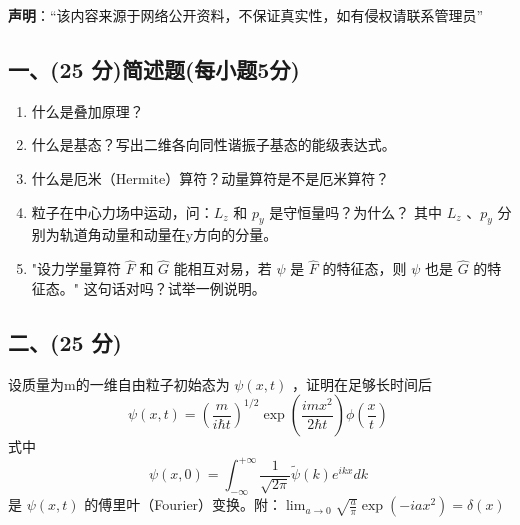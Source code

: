 
\textbf{声明}：“该内容来源于网络公开资料，不保证真实性，如有侵权请联系管理员”

\subsection{一、(25 分)简述题(每小题5分)}
\begin{enumerate}
        \item 什么是叠加原理？
        \item 什么是基态？写出二维各向同性谐振子基态的能级表达式。
        \item 什么是厄米（Hermite）算符？动量算符是不是厄米算符？
        \item 粒子在中心力场中运动，问：$L_z$ 和 $p_y$ 是守恒量吗？为什么？
        其中 $L_z$ 、$p_y$ 分别为轨道角动量和动量在y方向的分量。
        \item "设力学量算符 $\hat{F}$ 和 $\hat{G}$ 能相互对易，若 $\psi$ 是 $\hat{F}$ 的特征态，则 $\psi$ 也是 $\hat{G}$ 的特征态。" 这句话对吗？试举一例说明。
    \end{enumerate}
\subsection{二、(25 分)}
设质量为m的一维自由粒子初始态为 $\psi(x,t)$ ，证明在足够长时间后
    \[  \psi(x,t) = \left(\frac{m}{i\hbar t}\right)^{1/2} \exp\left(\frac{imx^2}{2\hbar t}\right)\phi\left(\frac{x}{t}\right)   ~\]
    式中 
    \[  \psi(x,0) = \int_{-\infty}^{+\infty} \frac{1}{\sqrt{2\pi}} \tilde{\psi}(k) e^{ikx} dk  ~\]
    是 $\psi(x,t)$ 的傅里叶（Fourier）变换。附：$\lim_{a\to 0} \sqrt{\frac{a}{\pi}} \exp(-iax^2) = \delta(x)$

